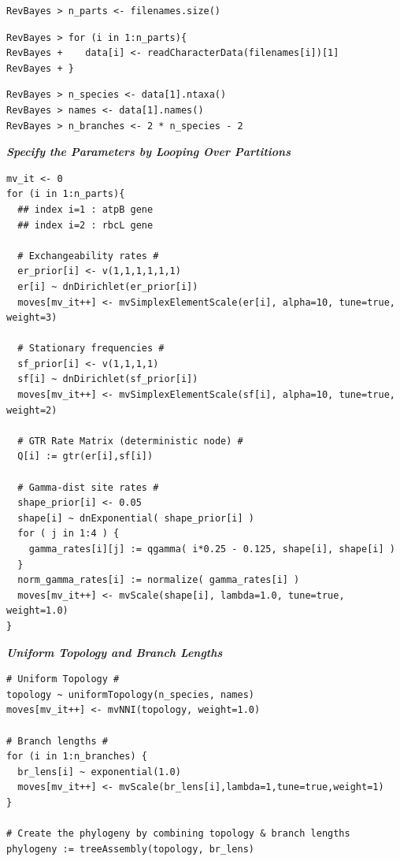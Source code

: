 \documentclass[11pt]{article}
\begin{document}
{\tt \begin{snugshade*}
\begin{lstlisting}
RevBayes > n_parts <- filenames.size()
\end{lstlisting}
\end{snugshade*}}

{\tt \begin{snugshade*}
\begin{lstlisting}
RevBayes > for (i in 1:n_parts){
RevBayes +    data[i] <- readCharacterData(filenames[i])[1]
RevBayes + }
\end{lstlisting}
\end{snugshade*}}

{\tt \begin{snugshade*}
\begin{lstlisting}
RevBayes > n_species <- data[1].ntaxa()
RevBayes > names <- data[1].names()
RevBayes > n_branches <- 2 * n_species - 2
\end{lstlisting}
\end{snugshade*}}

\textbf{\textit{Specify the Parameters by Looping Over Partitions}}


{\tt \small \begin{snugshade*}
\begin{lstlisting}
mv_it <- 0
for (i in 1:n_parts){
  ## index i=1 : atpB gene
  ## index i=2 : rbcL gene

  # Exchangeability rates #
  er_prior[i] <- v(1,1,1,1,1,1)
  er[i] ~ dnDirichlet(er_prior[i])
  moves[mv_it++] <- mvSimplexElementScale(er[i], alpha=10, tune=true, weight=3) 

  # Stationary frequencies #
  sf_prior[i] <- v(1,1,1,1)
  sf[i] ~ dnDirichlet(sf_prior[i])
  moves[mv_it++] <- mvSimplexElementScale(sf[i], alpha=10, tune=true, weight=2) 

  # GTR Rate Matrix (deterministic node) #
  Q[i] := gtr(er[i],sf[i]) 

  # Gamma-dist site rates #
  shape_prior[i] <- 0.05 
  shape[i] ~ dnExponential( shape_prior[i] )
  for ( j in 1:4 ) {
    gamma_rates[i][j] := qgamma( i*0.25 - 0.125, shape[i], shape[i] )
  }
  norm_gamma_rates[i] := normalize( gamma_rates[i] )
  moves[mv_it++] <- mvScale(shape[i], lambda=1.0, tune=true, weight=1.0)
}
\end{lstlisting}
\end{snugshade*}}


\textbf{\textit{Uniform Topology and Branch Lengths}}

{\tt \begin{snugshade*}
\begin{lstlisting}
# Uniform Topology #
topology ~ uniformTopology(n_species, names)
moves[mv_it++] <- mvNNI(topology, weight=1.0)

# Branch lengths #
for (i in 1:n_branches) {
  br_lens[i] ~ exponential(1.0)
  moves[mv_it++] <- mvScale(br_lens[i],lambda=1,tune=true,weight=1) 
}

# Create the phylogeny by combining topology & branch lengths
phylogeny := treeAssembly(topology, br_lens)
\end{lstlisting}
\end{snugshade*}}
\end{document}
